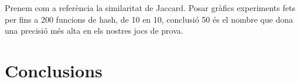 \documentclass[catalan, 12pt]{report}
\begin{document}
Prenem com a referència la similaritat de Jaccard. Posar gràfics experiments fets per fins a 200 funcions de hash, de 10 en 10, conclusió 50 és el nombre que dona una precisió més alta en els nostres jocs de prova.

\begin{center}
\end{center}

\begin{center}
\end{center}

\begin{center}
\end{center}

\begin{center}
\end{center}

\begin{center}
\end{center}

\begin{center}
\end{center}

\begin{center}
\end{center}


\chapter{Conclusions}
\end{document}
